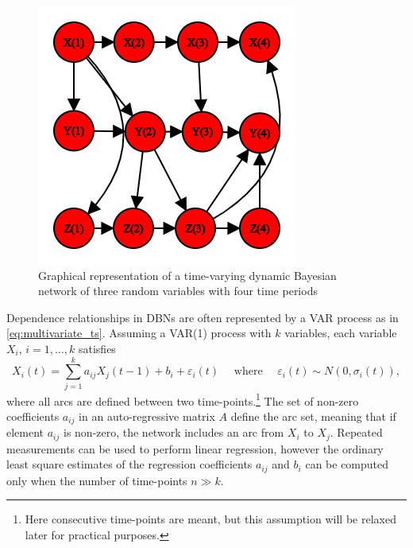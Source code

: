 \begin{figure}[H]
\centering
  \includegraphics[width=0.45\linewidth]{figures/dynamic_bn.png}
  \caption{Graphical representation of a time-varying dynamic Bayesian network of three random variables with four time periods}
  \label{fig:dynamic_bn}
\end{figure}


Dependence relationships in \acp{DBN} are often represented by a \ac{VAR} process as in \autoref{eq:multivariate_ts}. Assuming a \ac{VAR}(1) process with $k$ variables, each variable $X_i$, $i = 1,\ldots,k$ satisfies
\begin{equation}
X_{i}(t)=\sum_{j=1}^{k} a_{i j} X_{j}(t-1)+b_{i}+\varepsilon_{i}(t) \quad \text { where } \quad \varepsilon_{i}(t) \sim N\left(0, \sigma_{i}(t)\right),
\end{equation}
where all arcs are defined between two time-points.\footnote{Here consecutive time-points are meant, but this assumption will be relaxed later for practical purposes.} The set of non-zero coefficients $a_{ij}$ in an auto-regressive matrix $A$ define the arc set, meaning that if element $a_{ij}$ is non-zero, the network includes an arc from $X_i$ to $X_j$. Repeated measurements can be used to perform linear regression, however the ordinary least square estimates of the regression coefficients $a_{ij}$ and $b_i$ can be computed only when the number of time-points $n \gg k$.





